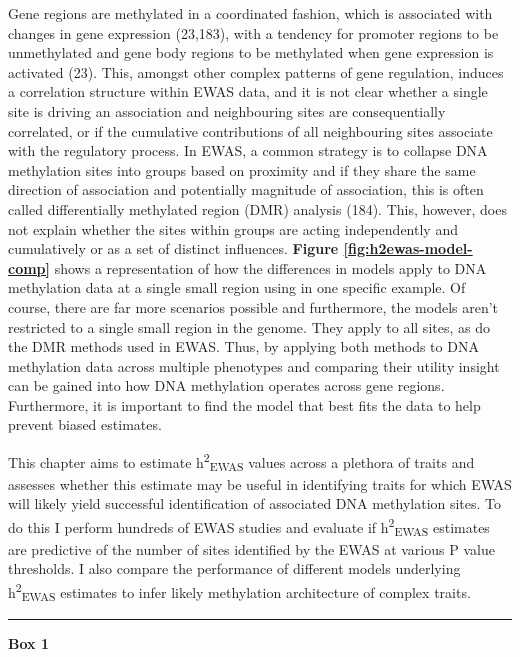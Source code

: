 \documentclass[11pt,twoside]{bristolthesis}
\begin{document}
Gene regions are methylated in a coordinated fashion, which is associated with changes in gene expression (23,183), with a tendency for promoter regions to be unmethylated and gene body regions to be methylated when gene expression is activated (23). This, amongst other complex patterns of gene regulation, induces a correlation structure within EWAS data, and it is not clear whether a single site is driving an association and neighbouring sites are consequentially correlated, or if the cumulative contributions of all neighbouring sites associate with the regulatory process. In EWAS, a common strategy is to collapse DNA methylation sites into groups based on proximity and if they share the same direction of association and potentially magnitude of association, this is often called differentially methylated region (DMR) analysis (184). This, however, does not explain whether the sites within groups are acting independently and cumulatively or as a set of distinct influences. \textbf{Figure \ref{fig:h2ewas-model-comp}} shows a representation of how the differences in models apply to DNA methylation data at a single small region using in one specific example. Of course, there are far more scenarios possible and furthermore, the models aren't restricted to a single small region in the genome. They apply to all sites, as do the DMR methods used in EWAS. Thus, by applying both methods to DNA methylation data across multiple phenotypes and comparing their utility insight can be gained into how DNA methylation operates across gene regions. Furthermore, it is important to find the model that best fits the data to help prevent biased estimates.

This chapter aims to estimate h\textsuperscript{2}\textsubscript{EWAS} values across a plethora of traits and assesses whether this estimate may be useful in identifying traits for which EWAS will likely yield successful identification of associated DNA methylation sites. To do this I perform hundreds of EWAS studies and evaluate if h\textsuperscript{2}\textsubscript{EWAS} estimates are predictive of the number of sites identified by the EWAS at various P value thresholds. I also compare the performance of different models underlying h\textsuperscript{2}\textsubscript{EWAS} estimates to infer likely methylation architecture of complex traits.
\begin{center}\rule{0.5\linewidth}{0.5pt}\end{center}

\textbf{Box 1}
\end{document}
